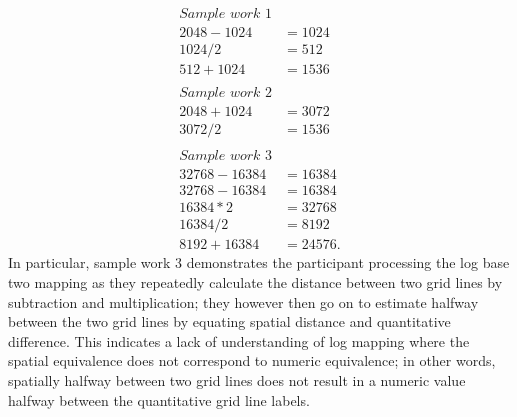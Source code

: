 \documentclass[print]{nuthesis}
\begin{document}
\begin{align}
\textit{Sample work 1} \nonumber\\
2048-1024 &= 1024 \nonumber \\
1024/2 &= 512 \nonumber\\
512+1024 &= 1536 \nonumber\\
\nonumber\\
\textit{Sample work 2} \nonumber\\
2048 + 1024 & =3072 \nonumber\\
3072/2 & =1536 \nonumber\\
\nonumber\\
\textit{Sample work 3} \nonumber\\
32768-16384&=16384  \nonumber\\
32768-16384&=16384  \nonumber\\
16384*2&=32768  \nonumber\\
16384/2&=8192  \nonumber\\
8192+16384&=24576.  \nonumber
\end{align}
In particular, sample work 3 demonstrates the participant processing the log base two mapping as they repeatedly calculate the distance between two grid lines by subtraction and multiplication; they however then go on to estimate halfway between the two grid lines by equating spatial distance and quantitative difference.
This indicates a lack of understanding of log mapping where the spatial equivalence does not correspond to numeric equivalence; in other words, spatially halfway between two grid lines does not result in a numeric value halfway between the quantitative grid line labels.
\end{document}
